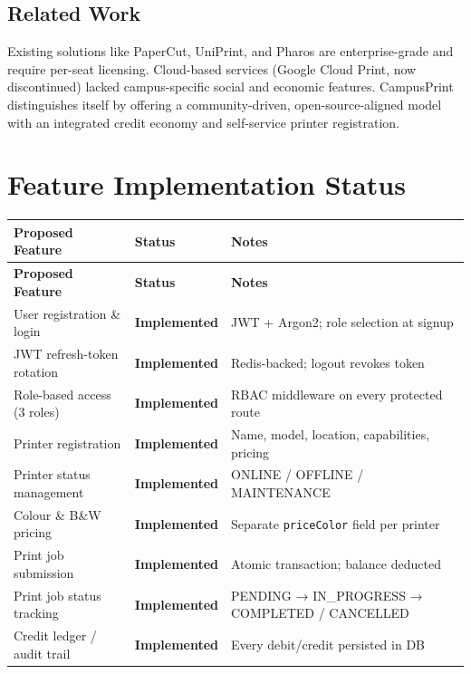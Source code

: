 \documentclass[12pt,a4paper]{report}
\begin{document}
\subsection{Related Work}
Existing solutions like PaperCut, UniPrint, and Pharos are enterprise-grade and require
per-seat licensing. Cloud-based services (Google Cloud Print, now discontinued) lacked
campus-specific social and economic features. CampusPrint distinguishes itself by offering a
community-driven, open-source-aligned model with an integrated credit economy and
self-service printer registration.

\section{Feature Implementation Status}

\begin{longtable}{L{5.5cm} C{3.5cm} L{5.5cm}}
  \toprule
  \textbf{Proposed Feature} & \textbf{Status} & \textbf{Notes} \\
  \midrule
  \endfirsthead
  \midrule
  \textbf{Proposed Feature} & \textbf{Status} & \textbf{Notes} \\
  \midrule
  \endhead
  \bottomrule
  \endfoot
  User registration \& login & \textcolor{secondary}{\textbf{Implemented}} & JWT + Argon2; role selection at signup \\
  JWT refresh-token rotation & \textcolor{secondary}{\textbf{Implemented}} & Redis-backed; logout revokes token \\
  Role-based access (3 roles) & \textcolor{secondary}{\textbf{Implemented}} & RBAC middleware on every protected route \\
  Printer registration & \textcolor{secondary}{\textbf{Implemented}} & Name, model, location, capabilities, pricing \\
  Printer status management & \textcolor{secondary}{\textbf{Implemented}} & ONLINE / OFFLINE / MAINTENANCE \\
  Colour \& B\&W pricing & \textcolor{secondary}{\textbf{Implemented}} & Separate \texttt{priceColor} field per printer \\
  Print job submission & \textcolor{secondary}{\textbf{Implemented}} & Atomic transaction; balance deducted \\
  Print job status tracking & \textcolor{secondary}{\textbf{Implemented}} & PENDING → IN\_PROGRESS → COMPLETED / CANCELLED \\
  Credit ledger / audit trail & \textcolor{secondary}{\textbf{Implemented}} & Every debit/credit persisted in DB \\

\end{longtable}
\end{document}
